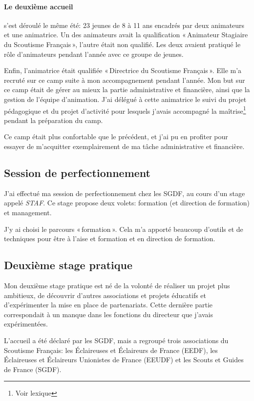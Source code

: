 \documentclass[titlepage,11pt,a4paper]{article}
\begin{document}
\paragraph{Le deuxième accueil} s'est déroulé le même été: 23 jeunes de 8 à 11 ans
encadrés par deux animateurs et une animatrice. Un des animateurs avait la qualification
«\,Animateur Stagiaire du Scoutisme Français\,», l'autre était non qualifié. Les deux
avaient pratiqué le rôle d'animateurs pendant l'année avec ce groupe de jeunes.

Enfin, l'animatrice était qualifiée «\,Directrice du Scoutisme Français\,». Elle m'a
recruté sur ce camp suite à mon accompagnement pendant l'année. Mon but sur ce camp était
de gérer au mieux la partie administrative et financière, ainsi que la gestion de l'équipe
d'animation. J'ai délégué à cette animatrice le suivi du projet pédagogique et du projet
d'activité pour lesquels j'avais accompagné la maîtrise\footnote{Voir lexique} pendant la
préparation du camp.

Ce camp était plus confortable que le précédent, et j'ai pu en profiter pour essayer
de m'acquitter exemplairement de ma tâche administrative et financière.

\subsection{Session de perfectionnement}

J'ai effectué ma session de perfectionnement chez les SGDF, au cours d'un stage appelé
\emph{STAF}. Ce stage propose deux volets: formation (et direction de formation) et
management.

J'y ai choisi le parcours «\,formation\,». Cela m'a apporté beaucoup d'outils et de
techniques pour être à l'aise et formation et en direction de formation.

\subsection{Deuxième stage pratique}

Mon deuxième stage pratique est né de la volonté de réaliser un projet plus ambitieux, de
découvrir d'autres associations et projets éducatifs et d'expérimenter la mise en place de
partenariats. Cette dernière partie correspondait à un manque dans les fonctions du
directeur que j'avais expérimentées.

L'accueil a été déclaré par les SGDF, mais a regroupé trois associations du Scoutisme
Français: les Éclaireuses et Éclaireurs de France (EEDF), les Éclaireuses et Éclaireurs
Unionistes de France (EEUDF) et les Scouts et Guides de France (SGDF).
\end{document}

